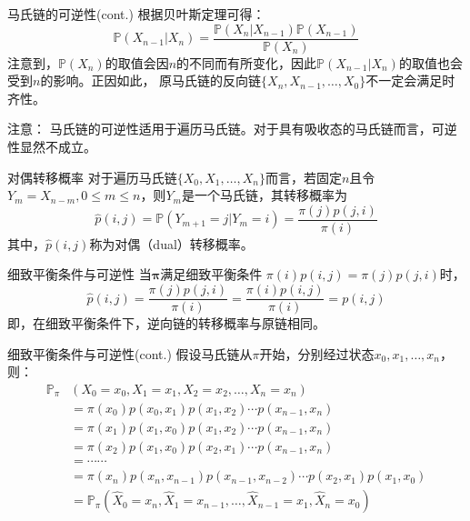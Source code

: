 \documentclass[t]{beamer}
\renewcommand{\Pr}{\mathbb{P}}
\begin{document}
\begin{frame}{马氏链的可逆性(cont.)}
    根据贝叶斯定理可得：
    \[\Pr(X_{n-1}|X_n)=\frac{\Pr(X_{n}|X_{n-1})\Pr(X_{n-1})}{\Pr(X_n)} \]
    注意到，$\Pr(X_n)$的取值会因$n$的不同而有所变化，因此$\Pr(X_{n-1}|X_n)$的取值也会受到$n$的影响。正因如此，
    原马氏链的反向链$\{X_n,X_{n-1}, \ldots,X_0\}$不一定会满足时齐性。
    
    \begin{block}{注意：}
        马氏链的可逆性适用于遍历马氏链。对于具有吸收态的马氏链而言，可逆性显然不成立。  
    \end{block}

\end{frame}


\begin{frame}{对偶转移概率}
    对于遍历马氏链$\{X_0,X_1,\ldots,X_n\}$而言，若固定$n$且令$Y_m=X_{n-m},  0\le m\le n$，则$Y_m$是一个马氏链，其转移概率为\[\hat p(i,j)=\Pr(Y_{m+1}=j|Y_m=i)=\frac{\pi(j)p(j,i)}{\pi(i)} \]
    其中，$\hat p(i,j)$称为对偶（dual）转移概率。
\end{frame}


\begin{frame}{细致平衡条件与可逆性}
    当$\bm{\pi}$满足{细致平衡条件} $\pi(i)p(i,j)=\pi(j)p(j,i)$时，
    \[{\hat p(i,j)}=\frac{\pi(j)p(j,i)}{\pi(i)}=\frac{\pi(i)p(i,j)}{\pi(i)}={p(i,j)} \]
    即，在细致平衡条件下，逆向链的转移概率与原链相同。
\end{frame}


\begin{frame}{细致平衡条件与可逆性(cont.)}
    假设马氏链从$\pi$开始，分别经过状态$x_0,x_1,\ldots, x_n$，则：
    \[\begin{split}
    \Pr_{\pi}&\left({X_0=x_0,X_1=x_1,X_2=x_2,\ldots,X_n=x_n}\right)\\ &={\pi(x_0)p(x_0,x_1)}p(x_1,x_2)\cdots p(x_{n-1},x_n)\\
    &={{\pi(x_1)}{p(x_1,x_0)}}p(x_1,x_2)\cdots p(x_{n-1},x_n)\\
    &={\pi(x_2)}p(x_1,x_0){p(x_2,x_1)}\cdots p(x_{n-1},x_n)\\
     &=\cdots\cdots\\
    &=\pi(x_n)p(x_{n},x_{n-1})p(x_{n-1},x_{n-2})\cdots p(x_2,x_1)p(x_1,x_0)\\
    &=\Pr_{\pi}\left({\hat X_0=x_n,\hat X_1=x_{n-1},\ldots,\hat X_{n-1}=x_1, \hat X_n=x_0}\right)\\
    \end{split}\]
\end{frame}
\end{document}
